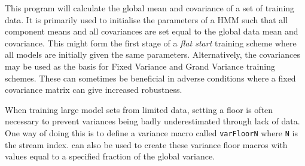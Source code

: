 %
%


\newpage
{}


This program will calculate the global mean and covariance
of a set of training data.  It is primarily used to initialise
the parameters of a HMM such that all component means and all covariances
are set equal to the global data mean and covariance.  This might form
the first stage of a \textit{flat start} training scheme 
where all models are initially given the same parameters.  
Alternatively, the covariances may be used as the basis for Fixed
Variance and Grand Variance training schemes.  These can sometimes be
beneficial in adverse conditions where a fixed covariance matrix can
give increased robustness.

When training large model sets from limited data, setting a floor
is often necessary to prevent variances being badly underestimated
through lack of data.  One way of doing this is to define
a variance macro called \texttt{varFloorN}
where \texttt{N} is the stream index.  can also be
used to create these variance floor macros with values equal to
a specified fraction of the global variance.


